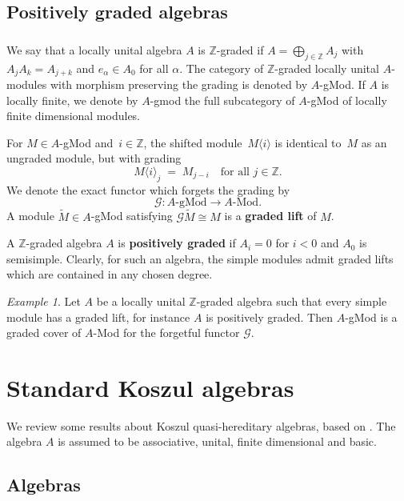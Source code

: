 \documentclass[11pt]{amsart}
\newcommand{\GG}{\mathscr{G}}
\newcommand{\op}{{\rm op}}
\newcommand{\mZ}{\mathbb{Z}}
\numberwithin{equation}{section}
\theoremstyle{plain}
\theoremstyle{remark}
\theoremstyle{remark}
\newtheorem{ex}[subsubsection]{Example}
\theoremstyle{construction}
\begin{document}
\subsection{Positively graded algebras}
\subsubsection{}We say that a locally unital algebra $A$ is $\mZ$-graded if $A=\bigoplus_{j\in\mZ}A_j$ with $A_jA_k=A_{j+k}$ and $e_\alpha\in A_0$ for all $\alpha$. The category of $\mZ$-graded locally unital $A$-modules with morphism preserving the grading is denoted by $A$-gMod. If $A$ is locally finite, we denote by $A$-gmod the full subcategory of $A$-gMod of locally finite dimensional modules. 

For $M\in A$-gMod and~$i\in\mZ$, the shifted module~$M\langle i\rangle$ is identical to~$M$ as an ungraded module, but with grading
$$M\langle i\rangle_j\;=\; M_{j-i}\quad\mbox{for all $j\in\mZ$}.$$ We denote the exact functor {which forgets} the grading by 
$$\GG: A\mbox{-gMod}\to A\mbox{-Mod}.$$
A module $\widetilde{M}\in A$-gMod satisfying $\GG \widetilde{M}\cong M$ is a {\bf graded lift} of $M$.

A $\mZ$-graded algebra $A$ is {\bf positively graded} if $A_i=0$ for $i<0$ and  $A_0$ is semisimple. Clearly, for such an algebra, the simple modules admit graded lifts which are contained in {any chosen} degree.


\begin{ex}\label{ExAg}
Let $A$ be a locally unital $\mZ$-graded algebra such that every simple module has a graded lift, for instance $A$ is positively graded. Then $A$-gMod is a graded cover of $A$-Mod for the forgetful functor {$\GG$}.
\end{ex}




\section{Standard Koszul algebras}\label{AppKos}
We review some results about Koszul quasi-hereditary algebras, based on \cite{ADL, BGS}. The algebra $A$ is assumed to be associative, unital, finite dimensional and basic. 

\subsection{Algebras}

\end{document}
